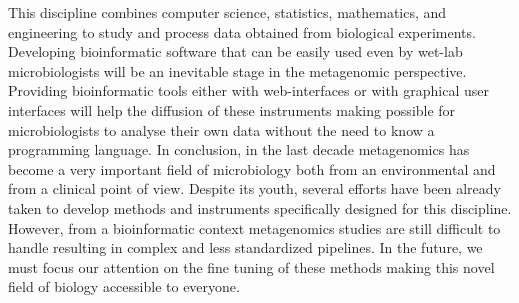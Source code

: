This discipline combines computer science, statistics, mathematics, and engineering to study and process data obtained from biological experiments. Developing bioinformatic software that can be easily used even by wet-lab microbiologists will be an inevitable stage in the metagenomic perspective. Providing bioinformatic tools either with web-interfaces or with graphical user interfaces will help the diffusion of these instruments making possible for microbiologists to analyse their own data without the need to know a programming language. In conclusion, in the last decade metagenomics has become a very important field of microbiology both from an environmental and from a clinical point of view. Despite its youth, several efforts have been already taken to develop methods and instruments specifically designed for this discipline. However, from a bioinformatic context metagenomics studies are still difficult to handle resulting in complex and less standardized pipelines. In the future, we must focus our attention on the fine tuning of these methods making this novel field of biology accessible to everyone.\\
